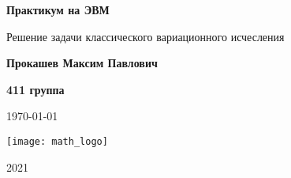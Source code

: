 \begin{titlepage}
	\begin{center}
		\Huge
		\textbf{Практикум на ЭВМ}
		\vspace{0.5cm}
		
		\Large
		Решение задачи классического вариационного исчесления
		\vspace{1.5cm}
		
		\LARGE
		\textbf{Прокашев Максим Павлович}
		
		\vspace{0.5cm}
		\textbf{411 группа}
		
		\vspace{0.5cm}
		\today
		
		\vfill
		\texttt{[image: math\_logo]}
		\vspace{0.5cm}
		
		\Large
		2021
	\end{center}
\end{titlepage}